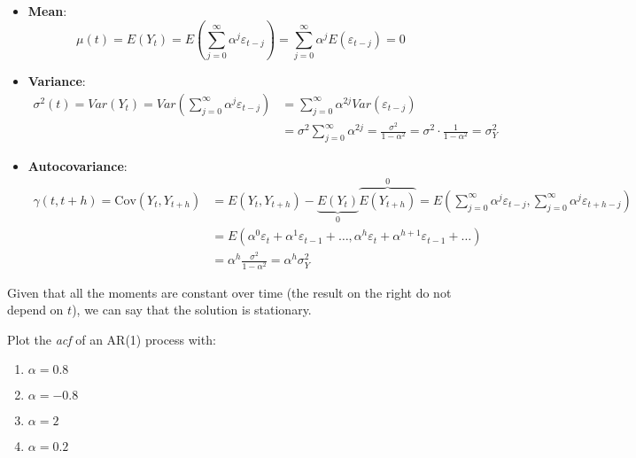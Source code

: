         \begin{itemize}
            \item \textbf{Mean}: 
            \begin{equation}
                \mu(t) = E(Y_t) = E\left(\sum_{j=0}^{\infty} \alpha^j \varepsilon_{t-j}\right) = \sum_{j=0}^{\infty} \alpha^j E(\varepsilon_{t-j}) = 0
            \end{equation}
            \item \textbf{Variance}:
            \begin{equation}
                \begin{split}
                    \sigma^2(t) = Var(Y_t) = Var\left(\sum_{j=0}^{\infty} \alpha^j \varepsilon_{t-j}\right) & = \sum_{j=0}^{\infty} \alpha^{2j} Var(\varepsilon_{t-j}) \\ 
                    & = \sigma^2 \sum_{j=0}^{\infty} \alpha^{2j} = \frac{\sigma^2}{1-\alpha^2} = \sigma^2 \cdot \frac{1}{1-\alpha^2} = \sigma^2_Y
                \end{split}
            \end{equation}
            \item \textbf{Autocovariance}:
            \begin{equation}
                \begin{split}
                    \gamma(t, t+h) = \text{Cov}(Y_t, Y_{t+h}) & = E(Y_t, Y_{t+h}) - \underbrace{E(Y_t)}_{0} \overbrace{E(Y_{t+h})}^{0} = E\left(\sum_{j=0}^{\infty} \alpha^j \varepsilon_{t-j}, \sum_{j=0}^{\infty} \alpha^j \varepsilon_{t+h-j}\right) \\& = E(\alpha^0 \varepsilon_t + \alpha^1 \varepsilon_{t-1} + \ldots, \alpha^h \varepsilon_{t} + \alpha^{h+1} \varepsilon_{t-1} + \ldots) \\ & = \alpha^h \frac{\sigma^2}{1-\alpha^2} = \alpha^h \sigma^2_Y
                \end{split}
            \end{equation}
        \end{itemize}

        Given that all the moments are constant over time (the result on the right do not depend on \(t\)), we can say that the solution is stationary.

        \begin{example}[Do it yourself!]
            Plot the \textit{acf} of an AR(1) process with:
            \begin{enumerate}
                \item \(\alpha = 0.8\)
                \item \(\alpha = -0.8\)
                \item \(\alpha = 2\)
                \item \(\alpha = 0.2\)
            \end{enumerate}
        \end{example}

